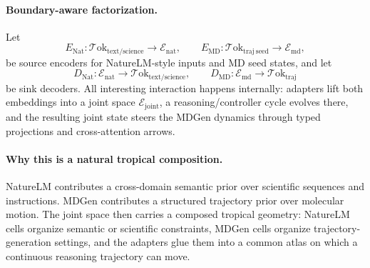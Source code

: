 \documentclass[11pt]{article}
\theoremstyle{definition}
\theoremstyle{plain}
\theoremstyle{remark}
\newcommand{\mc}[1]{\mathcal{#1}}
\newcommand{\Emb}{\mc{E}}
\newcommand{\Tok}{\mc{T}\mathrm{ok}}
\begin{document}
\paragraph{Boundary-aware factorization.}
Let
\[
E_{\mathrm{Nat}}:\Tok_{\mathrm{text/science}}\to \Emb_{\mathrm{nat}},
\qquad
E_{\mathrm{MD}}:\Tok_{\mathrm{traj\ seed}}\to \Emb_{\mathrm{md}},
\]
be source encoders for NatureLM-style inputs and MD seed states, and let
\[
D_{\mathrm{Nat}}:\Emb_{\mathrm{nat}}\to \Tok_{\mathrm{text/science}},
\qquad
D_{\mathrm{MD}}:\Emb_{\mathrm{md}}\to \Tok_{\mathrm{traj}}
\]
be sink decoders.
All interesting interaction happens internally:
adapters lift both embeddings into a joint space $\Emb_{\mathrm{joint}}$, a reasoning/controller cycle evolves there, and the resulting joint state steers the MDGen dynamics through typed projections and cross-attention arrows.

\paragraph{Why this is a natural tropical composition.}
NatureLM contributes a cross-domain semantic prior over scientific sequences and instructions.
MDGen contributes a structured trajectory prior over molecular motion.
The joint space then carries a composed tropical geometry:
NatureLM cells organize semantic or scientific constraints, MDGen cells organize trajectory-generation settings, and the adapters glue them into a common atlas on which a continuous reasoning trajectory can move.
\end{document}
